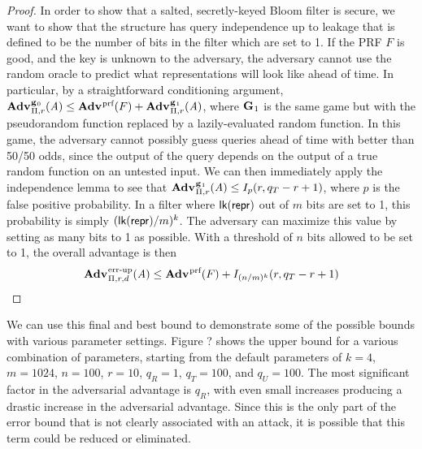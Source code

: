 \begin{proof}
In order to show that a salted, secretly-keyed Bloom filter is secure, we want
to show that the structure has query independence up to leakage that is defined
to be the number of bits in the filter which are set to 1. If the PRF $F$ is
good, and the key is unknown to the adversary, the adversary cannot use the
random oracle to predict what representations will look like ahead of time. In
particular, by a straightforward conditioning argument,
$\Adv{\game_0}_{\struct,r}(\advA) \le \Adv{\prf}(F) +
\Adv{\game_1}_{\struct,r}(\advA)$, where $\mathbf{G}\hspace{0.5pt}_1$ is the same game but with the
pseudorandom function replaced by a lazily-evaluated random function. In this
game, the adversary cannot possibly guess queries ahead of time with better than
50/50 odds, since the output of the query depends on the output of a true random
function on an untested input. We can then immediately apply the independence
lemma to see that $\Adv{\game_1}_{\struct,r}(\advA) \le I_p(r, q_T-r+1)$, where
$p$ is the false positive probability. In a filter where $\textsf{lk}(\mathsf{repr})$ out
of $m$ bits are set to 1, this probability is simply $(\textsf{lk}(\mathsf{repr})/m)^k$.
The adversary can maximize this value by setting as many bits to 1 as possible.
With a threshold of $n$ bits allowed to be set to 1, the overall advantage is
then
$$\Adv{\errep}_{\struct,r,d}(\advA) \le \Adv{\prf}(F) + I_{(n/m)^k}(r, q_T-r+1)$$
\end{proof}



We can use this final and best bound to demonstrate some of the possible bounds
with various parameter settings. Figure ? shows the upper bound for a various
combination of parameters, starting from the default parameters of $k = 4$, $m =
1024$, $n = 100$, $r = 10$, $q_R = 1$, $q_T = 100$, and $q_U = 100$. The most
significant factor in the adversarial advantage is $q_R$, with even small
increases producing a drastic increase in the adversarial advantage. Since this
is the only part of the error bound that is not clearly associated with an
attack, it is possible that this term could be reduced or eliminated.

